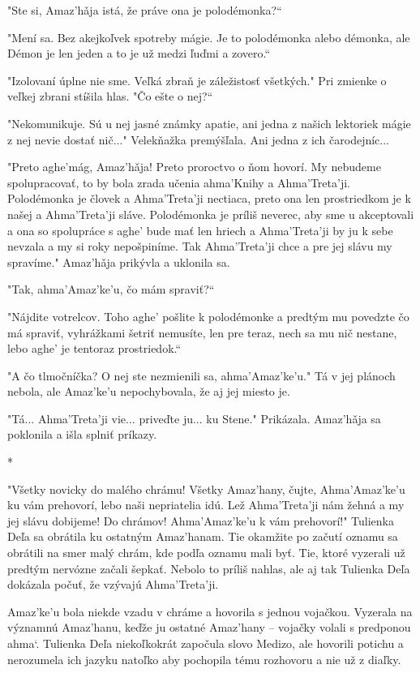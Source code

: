\documentclass{book}
\begin{document}
"$ $Ste si, Amaz'ha\v{}ja istá, že práve ona je polodémonka?“

"$ $Mení sa. Bez akejkoľvek spotreby mágie. Je to polodémonka alebo démonka, ale Démon je len jeden a to je už medzi ľuďmi a zovero.“

"$ $Izolovaní úplne nie sme. Veľká zbraň je záležistosť všetkých."$ $ Pri zmienke o veľkej zbrani stíšila hlas. "$ $Čo ešte o nej?“

"$ $Nekomunikuje. Sú u nej jasné známky apatie, ani jedna z našich lektoriek mágie z nej nevie dostať nič..."$ $ Velekňažka premýšľala. Ani jedna z ich čarodejníc...

"$ $Preto aghe'mág, Amaz'ha\v{}ja! Preto proroctvo o ňom hovorí. My nebudeme spolupracovať, to by bola zrada učenia ahma'Knihy a Ahma'Treta'ji. Polodémonka je človek a Ahma'Treta'ji nectiaca, preto ona len prostriedkom je k našej a Ahma'Treta'ji sláve. Polodémonka je príliš neverec, aby sme u akceptovali a ona so spolupráce s aghe' bude mať len hriech a Ahma'Treta'ji by ju k sebe nevzala a my si roky nepošpiníme. Tak Ahma'Treta'ji chce a pre jej slávu my spravíme."$ $ Amaz'ha\v{}ja prikývla a uklonila sa.

"$ $Tak, ahma'Amaz'ke'u, čo mám spraviť?“

"$ $Nájdite votrelcov. Toho aghe' pošlite k polodémonke a predtým mu povedzte čo má spraviť, vyhrážkami šetriť nemusíte, len pre teraz, nech sa mu nič nestane, lebo aghe' je tentoraz prostriedok.“

"$ $A čo tlmočníčka? O nej ste nezmienili sa, ahma'Amaz'ke'u."$ $ Tá v jej plánoch nebola, ale Amaz'ke'u nepochybovala, že aj jej miesto je.

"$ $Tá... Ahma'Treta'ji vie... priveďte ju... ku Stene."$ $ Prikázala. Amaz'ha\v{}ja sa poklonila a išla splniť príkazy.

\begin{center}
*
\end{center}

"$ $Všetky novicky do malého chrámu! Všetky Amaz'hany, čujte, Ahma'Amaz'ke'u ku vám prehovorí, lebo naši nepriatelia idú. Lež Ahma'Treta'ji nám žehná a my jej slávu dobijeme! Do chrámov! Ahma'Amaz'ke'u k vám prehovorí!"$ $ Tulienka Deľa sa obrátila ku ostatným Amaz'hanam. Tie okamžite po začutí oznamu sa obrátili na smer malý chrám, kde podľa oznamu mali byť. Tie, ktoré vyzerali už predtým nervózne začali šepkať. Nebolo to príliš nahlas, ale aj tak Tulienka Deľa dokázala počuť, že vzývajú Ahma'Treta'ji.

Amaz'ke'u bola niekde vzadu v chráme a hovorila s jednou vojačkou. Vyzerala na významnú Amaz'hanu, keďže ju ostatné Amaz'hany – vojačky volali s predponou ahma‘. Tulienka Deľa niekoľkokrát započula slovo Medizo, ale hovorili potichu a nerozumela ich jazyku natoľko aby pochopila tému rozhovoru a nie už z diaľky.
\end{document}
